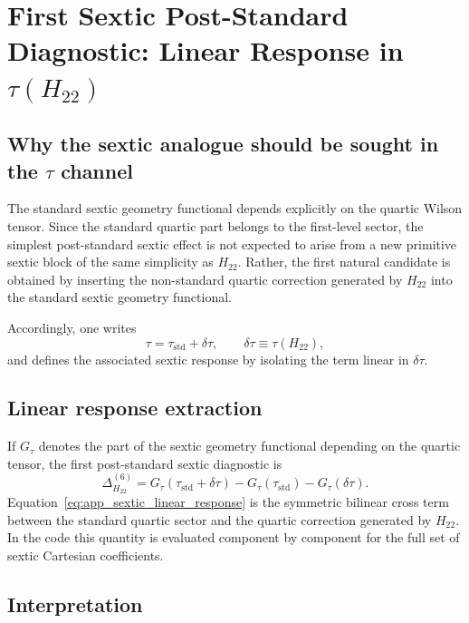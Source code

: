 \section{First Sextic Post-Standard Diagnostic: Linear Response in \texorpdfstring{$\tau(H_{22})$}{tau(H22)}}

\subsection{Why the sextic analogue should be sought in the \texorpdfstring{$\tau$}{tau} channel}

The standard sextic geometry functional depends explicitly on the quartic
Wilson tensor. Since the standard quartic part belongs to the first-level
sector, the simplest post-standard sextic effect is not expected to arise from
a new primitive sextic block of the same simplicity as $H_{22}$. Rather, the
first natural candidate is obtained by inserting the non-standard quartic
correction generated by $H_{22}$ into the standard sextic geometry functional.

Accordingly, one writes
\begin{equation}
\tau = \tau_{\mathrm{std}} + \delta\tau,
\qquad
\delta\tau \equiv \tau(H_{22}),
\end{equation}
and defines the associated sextic response by isolating the term linear in
$\delta\tau$.

\subsection{Linear response extraction}

If $G_\tau$ denotes the part of the sextic geometry functional depending on the
quartic tensor, the first post-standard sextic diagnostic is
\begin{equation}
\Delta^{(6)}_{H_{22}}
=
G_\tau(\tau_{\mathrm{std}}+\delta\tau)
-G_\tau(\tau_{\mathrm{std}})
-G_\tau(\delta\tau).
\label{eq:app_sextic_linear_response}
\end{equation}
Equation~\eqref{eq:app_sextic_linear_response} is the symmetric bilinear cross
term between the standard quartic sector and the quartic correction generated
by $H_{22}$. In the code this quantity is evaluated component by component for
the full set of sextic Cartesian coefficients.

\subsection{Interpretation}

